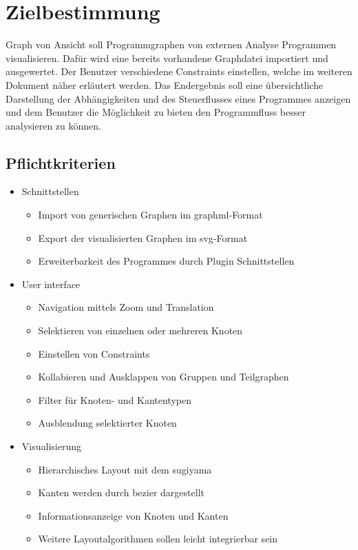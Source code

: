 \chapter{Zielbestimmung}

Graph von Ansicht soll Programmgraphen von externen Analyse Programmen visualisieren. Dafür wird eine bereits vorhandene Graphdatei importiert und ausgewertet. Der Benutzer verschiedene Constraints einstellen, welche im weiteren Dokument näher erläutert werden. 
Das Endergebnis soll eine übersichtliche Darstellung der Abhängigkeiten und des Steuerflusses eines Programmes anzeigen und dem Benutzer die Möglichkeit zu bieten den Programmfluss besser analysieren zu können.

\section{Pflichtkriterien}

\begin{itemize}
\item Schnittstellen
\begin{itemize}
\item Import von generischen Graphen im \gls{graphml}-Format
\item Export der visualisierten Graphen im \gls{svg}-Format
\item Erweiterbarkeit des Programmes durch Plugin Schnittstellen
\end{itemize}
\item User interface
\begin{itemize}
\item Navigation mittels Zoom und Translation
\item Selektieren von einzelnen oder mehreren Knoten
\item Einstellen von Constraints
\item Kollabieren und Ausklappen von Gruppen und Teilgraphen
\item Filter für Knoten- und Kantentypen
\item Ausblendung selektierter Knoten
\end{itemize}
\item Visualisierung
\begin{itemize}
\item Hierarchisches Layout mit dem \gls{sugiyama}
\item Kanten werden durch \gls{bezier} dargestellt
\item Informationsanzeige von Knoten und Kanten
\item Weitere Layoutalgorithmen sollen leicht integrierbar sein 
\end{itemize}
\end{itemize}

